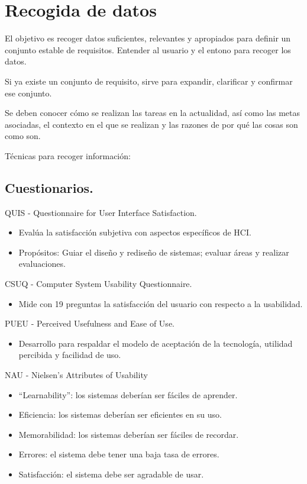 \documentclass[12pt, twoside, openright]{report} %
\begin{document}
\section{Recogida de datos}



El objetivo es recoger datos suficientes, relevantes y apropiados
para definir un conjunto estable de requisitos. Entender al usuario
y el entono para recoger los datos.

Si ya existe un conjunto de requisito, sirve para expandir,
clarificar y confirmar ese conjunto.

Se deben conocer cómo se realizan las tareas en la actualidad, así
como las metas asociadas, el contexto en el que se realizan y las
razones de por qué las cosas son como son.

Técnicas para recoger información:

\subsection{Cuestionarios.}

QUIS - Questionnaire for User Interface Satisfaction.

\begin{itemize}
	\item Evalúa la satisfacción subjetiva con aspectos específicos de
	      HCI.
	\item Propósitos: Guiar el diseño y rediseño de sistemas; evaluar
	      áreas y realizar evaluaciones.
\end{itemize}
\pagebreak
CSUQ - Computer System Usability Questionnaire.

\begin{itemize}
	\item Mide con 19 preguntas la satisfacción del usuario con respecto
	      a la usabilidad.
\end{itemize}

PUEU - Perceived Usefulness and Ease of Use.

\begin{itemize}
	\item Desarrollo para respaldar el modelo de aceptación de la
	      tecnología, utilidad percibida y facilidad de uso.
\end{itemize}

NAU - Nielsen's Attributes of Usability

\begin{itemize}
	\item \enquote{Learnability}: los sistemas deberían ser fáciles de
	      aprender.
	\item Eficiencia: los sistemas deberían ser eficientes en su uso.
	\item Memorabilidad: los sistemas deberían ser fáciles de recordar.
	\item Errores: el sistema debe tener una baja tasa de errores.
	\item Satisfacción: el sistema debe ser agradable de usar.
\end{itemize}
\end{document}
